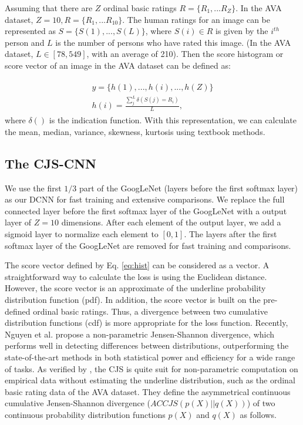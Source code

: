 \documentclass[letterpaper]{article} %
\begin{document}
Assuming that there are $Z$ ordinal basic ratings $R = \{R_1,...R_Z\}$. In the AVA dataset, $Z=10, R = \{R_1,...R_{10}\}$. The human ratings for an image can be represented as $S = \{S(1),...,S(L)\}$, where $S(i) \in R$ is given by the $i^{th}$ person and $L$ is the number of persons who have rated this image. (In the AVA dataset, $L \in [78,549]$, with an average of 210). Then the score histogram or score vector of an image in the AVA dataset can be defined as:



\begin{eqnarray}
\begin{split}
y = \{h(1),...,h(i),...,h(Z)\}\\
h(i) = \frac{\sum_{j}^{L}\delta(S(j)=R_i)}{L},
\end{split}
\label{eq:hist}
\end{eqnarray}
where $\delta()$ is the indication function. With this representation, we can calculate the mean, median, variance, skewness, kurtosis using textbook methods.


\subsection{The CJS-CNN}
\label{sec:CJS-CNN}

We use the first $1/3$ part of the GoogLeNet (layers before the first softmax layer) as our DCNN for fast training and extensive comparisons. We replace the full connected layer before the first softmax layer of the GoogLeNet with a output layer of $Z=10$ dimensions. After each element of the output layer, we add a sigmoid layer to normalize each element to $[0,1]$. The layers after the first softmax layer of the GoogLeNet are removed for fast training and comparisons.

The score vector defined by Eq. \ref{eq:hist} can be considered as a vector. A straightforward way to calculate the loss is using the Euclidean distance. However, the score vector is an approximate of the underline probability distribution function (pdf). In addition, the score vector is built on the pre-defined ordinal basic ratings.  Thus, a divergence between two cumulative distribution functions (cdf) is more appropriate  for the loss function. Recently, Nguyen et al. \cite{NguyenECML2015} propose a non-parametric Jensen-Shannon divergence, which performs well in detecting differences between distributions, outperforming the state-of-the-art methods in both statistical power and efficiency for a wide range of tasks. As verified by \cite{NguyenECML2015}, the CJS is quite suit for  non-parametric computation on empirical data without estimating the underline distribution, such as the ordinal basic rating data of the AVA dataset. They define the asymmetrical continuous cumulative Jensen-Shannon divergence ($ACCJS(p(X)||q(X))$) of two continuous probability distribution functions $p(X)$ and $q(X)$ as follows.
\end{document}
